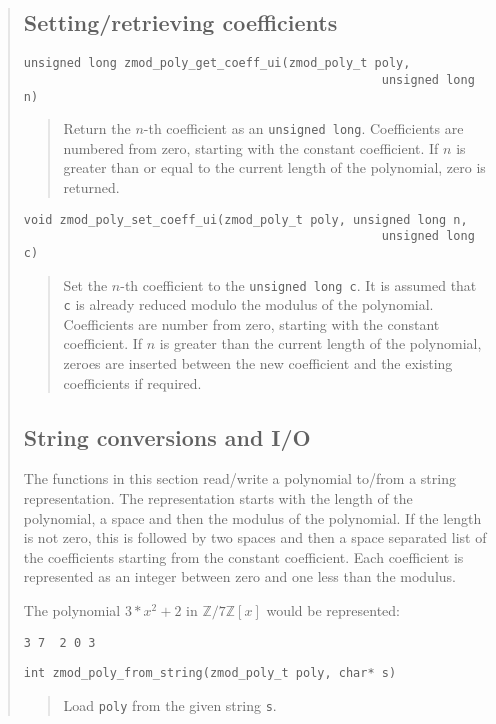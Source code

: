 \documentclass[a4paper,10pt]{article}
\newcommand{\Z}{\mathbb{Z}}
\newcommand{\code}{\lstinline}
\begin{document}
\begin{quote}
\subsection{Setting/retrieving coefficients}

\begin{lstlisting}
unsigned long zmod_poly_get_coeff_ui(zmod_poly_t poly, 
                                                  unsigned long n)
\end{lstlisting}
\begin{quote}
Return the $n$-th coefficient as an \code{unsigned long}. Coefficients are numbered from zero, starting with the constant coefficient. If $n$ is greater than or equal to the current length of the polynomial, zero is returned.
\end{quote}

\begin{lstlisting}
void zmod_poly_set_coeff_ui(zmod_poly_t poly, unsigned long n, 
                                                  unsigned long c)
\end{lstlisting}
\begin{quote}
Set the $n$-th coefficient to the \code{unsigned long c}. It is assumed that \code{c} is already reduced modulo the modulus of the polynomial. Coefficients are number from zero, starting with the constant coefficient. If $n$ is greater than the current length of the polynomial, zeroes are inserted between the new coefficient and the existing coefficients if required.
\end{quote}

\subsection{String conversions and I/O}
The functions in this section read/write a polynomial to/from a string representation. The representation starts with the length of the polynomial, a space and then the modulus of the polynomial. If the length is not zero, this is followed by two spaces and then a space separated list of the coefficients starting from the constant coefficient. Each coefficient is represented as an integer between zero and one less than the modulus.

The polynomial $3*x^2+2$ in $\Z/7\Z[x]$ would be represented:

\begin{lstlisting}
3 7  2 0 3
\end{lstlisting}

\begin{lstlisting}
int zmod_poly_from_string(zmod_poly_t poly, char* s)
\end{lstlisting}
\begin{quote}
Load \code{poly} from the given string \code{s}.
\end{quote}


\end{quote}
\end{document}

